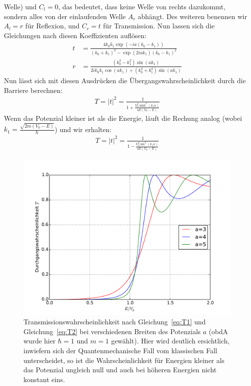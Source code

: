 Welle) und $C_l = 0$, das bedeutet, dass keine Welle von rechts dazukommt,
sondern alles von der einlaufenden Welle $A_r$ abhängt. Des weiteren
benennen wir $A_l=r$ für Reflexion, und $C_r=t$ für Transmission. Nun
lassen sich die Gleichungen nach diesen Koeffizienten auflösen:
\begin{align}
    t &= \frac{4k_0k_1\exp(-ia(k_0-k_1))}{(k_0+k_1)^2 - \exp(2iak_1)(k_0-k_1)^2}\\
    r &= \frac{(k_0^2 - k_1^2)\sin(ak_1)}{2ik_0k_1\cos(ak_1)+(k_0^2+k_1^2)\sin(ak_1)}
\end{align}
Nun lässt sich mit diesen Ausdrücken die Übergangswahrscheinlichkeit durch die 
Barriere berechnen:
\begin{align}
    T = \left | t \right |^2 = \frac{1}{1 + \frac{V_0^2 \sinh^2(k_1a)}{4E(V_0-E)}}
    \label{eq:T1}
\end{align}
Wenn das Potenzial kleiner ist als die Energie, läuft die Rechung analog
(wobei $k_1 = \frac{\sqrt{2m(V_0-E)}}{\hbar}$) und wir erhalten:
\begin{align}
    T = \left | t \right |^2 = \frac{1}{1 - \frac{V_0^2 \sin^2(k_1a)}{4E(V_0-E)}}
    \label{eq:T2}
\end{align}

\begin{figure}

\includegraphics[width=14cm]{pics/tunnel1}
\caption{Transmissionswahrscheinlichkeit nach Gleichung~\ref{eq:T1} und Gleichung~\ref{eq:T2}
bei verschiedenen Breiten des Potenzials $a$ (obdA wurde hier $\hbar=1$ und $m=1$ gewählt).
Hier wird deutlich ersichtlich, inwiefern sich der Quantenmechanische Fall vom klassischen
Fall unterscheidet, so ist die Wahrscheinlichkeit für Energien kleiner als das Potenzial ungleich
null und auch bei höheren Energien nicht konstant eins.} 

 \label{fig:tunnel1}
\end{figure}

